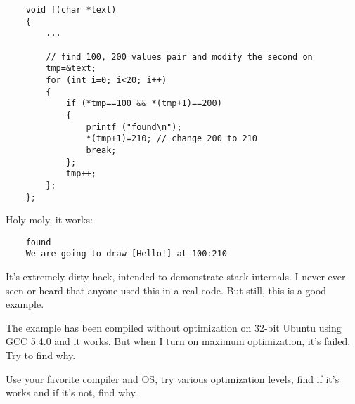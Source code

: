 \begin{lstlisting}
	void f(char *text)
	{
		...

		// find 100, 200 values pair and modify the second on
		tmp=&text;
		for (int i=0; i<20; i++)
		{
			if (*tmp==100 && *(tmp+1)==200)
			{
				printf ("found\n");
				*(tmp+1)=210; // change 200 to 210
				break;
			};
			tmp++;
		};
	};
\end{lstlisting}

Holy moly, it works:

\begin{lstlisting}
	found
	We are going to draw [Hello!] at 100:210
\end{lstlisting}


It's extremely dirty hack, intended to demonstrate stack internals.
I never ever seen or heard that anyone used this in a real code.
But still, this is a good example.

\myparagraph{\Exercise}

The example has been compiled without optimization on 32-bit Ubuntu using GCC 5.4.0 and it works.
But when I turn on  maximum optimization, it's failed.
Try to find why.

Use your favorite compiler and OS, try various optimization levels, find if it's works and if it's not, find why.

